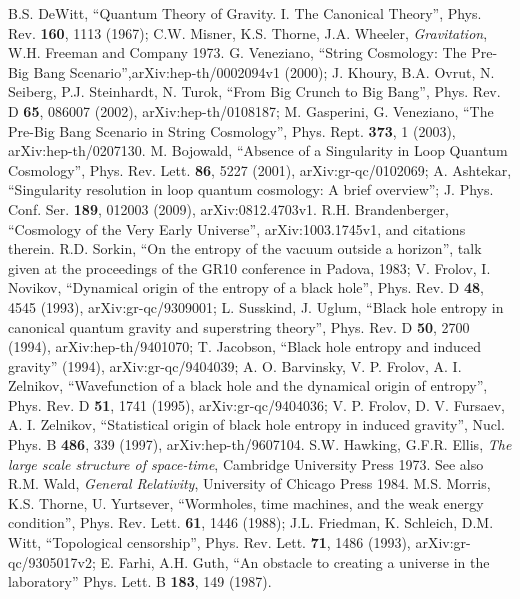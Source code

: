 \documentclass{article}
\begin{document}
\begin{thebibliography}{99}

\small
{}
B.S. DeWitt, ``Quantum Theory of Gravity. I. The Canonical Theory'', Phys. Rev. \textbf{160}, 1113 (1967); 
C.W. Misner, K.S. Thorne, J.A. Wheeler, \textit{Gravitation}, W.H. Freeman and Company 1973.
G. Veneziano, ``String Cosmology: The Pre-Big Bang Scenario'',arXiv:hep-th/0002094v1 (2000); J. Khoury, B.A. Ovrut, N. Seiberg, P.J. Steinhardt, N. Turok, ``From Big Crunch to Big Bang'', Phys. Rev. D \textbf{65}, 086007 (2002), arXiv:hep-th/0108187; M. Gasperini, G. Veneziano, ``The Pre-Big Bang Scenario in String Cosmology'', Phys. Rept. \textbf{373}, 1 (2003), arXiv:hep-th/0207130.
M. Bojowald, ``Absence of a Singularity in Loop Quantum Cosmology'', Phys. Rev. Lett. \textbf{86}, 5227 (2001), arXiv:gr-qc/0102069; A. Ashtekar, ``Singularity resolution in loop quantum cosmology: A brief overview''; J. Phys. Conf. Ser. \textbf{189}, 012003 (2009), arXiv:0812.4703v1.
R.H. Brandenberger, ``Cosmology of the Very Early Universe'', arXiv:1003.1745v1, and citations therein.
R.D. Sorkin, ``On the entropy of the vacuum outside a horizon'', talk given at the proceedings of the GR10 conference in Padova, 1983; V. Frolov, I. Novikov, ``Dynamical origin of the entropy of a black hole'', Phys. Rev. D \textbf{48}, 4545 (1993), arXiv:gr-qc/9309001; L. Susskind, J. Uglum, ``Black hole entropy in canonical quantum gravity and superstring theory'', Phys. Rev. D \textbf{50}, 2700 (1994), arXiv:hep-th/9401070; T. Jacobson, ``Black hole entropy and induced gravity'' (1994), arXiv:gr-qc/9404039; A. O. Barvinsky, V. P. Frolov, A. I. Zelnikov, ``Wavefunction of a black hole and the dynamical origin of entropy'', Phys. Rev. D \textbf{51}, 1741 (1995), arXiv:gr-qc/9404036; V. P. Frolov, D. V. Fursaev, A. I. Zelnikov, ``Statistical origin of black hole entropy in induced gravity'', Nucl. Phys. B \textbf{486}, 339 (1997), arXiv:hep-th/9607104.
S.W. Hawking, G.F.R. Ellis, \textit{The large scale structure of space-time}, Cambridge University Press 1973.  See also R.M. Wald, \textit{General Relativity}, University of Chicago Press 1984.
M.S. Morris, K.S. Thorne, U. Yurtsever, ``Wormholes, time machines, and the weak energy condition'', Phys. Rev. Lett. \textbf{61}, 1446 (1988); J.L. Friedman, K. Schleich, D.M. Witt, ``Topological censorship'', Phys. Rev. Lett. \textbf{71}, 1486 (1993), arXiv:gr-qc/9305017v2; 
E. Farhi, A.H. Guth, ``An obstacle to creating a universe in the laboratory'' Phys. Lett. B \textbf{183}, 149 (1987).

\end{thebibliography}
\end{document}
